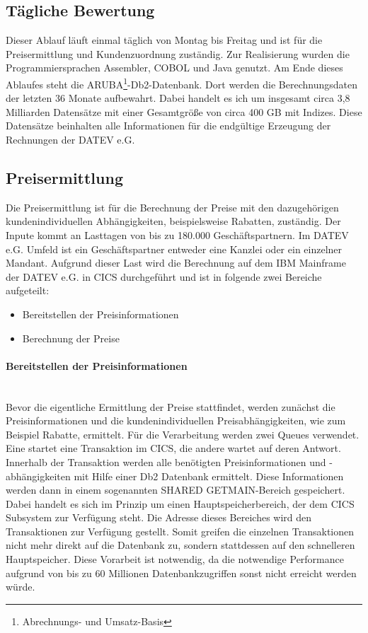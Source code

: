 \subsection{Tägliche Bewertung}\label{sssec:täglbew}
Dieser Ablauf läuft einmal täglich von Montag bis Freitag und ist für die Preisermittlung und Kundenzuordnung zuständig.
Zur Realisierung wurden die Programmiersprachen Assembler, COBOL und Java genutzt.
Am Ende dieses Ablaufes steht die ARUBA\footnote{Abrechnungs- und Umsatz-Basis}-Db2-Datenbank.
Dort werden die Berechnungsdaten der letzten 36 Monate aufbewahrt.
Dabei handelt es ich um insgesamt circa 3,8 Milliarden Datensätze mit einer Gesamtgröße von circa 400 GB mit Indizes.
Diese Datensätze beinhalten alle Informationen für die endgültige Erzeugung der Rechnungen der DATEV e.G.

\subsection{Preisermittlung}\label{ssec:preis}
Die Preisermittlung ist für die Berechnung der Preise mit den dazugehörigen kundenindividuellen Abhängigkeiten, beispielsweise Rabatten, zuständig.
Der Inpute kommt an Lasttagen von bis zu 180.000 Geschäftspartnern.
Im DATEV e.G. Umfeld ist ein Geschäftspartner entweder eine Kanzlei oder ein einzelner Mandant.
Aufgrund dieser Last wird die Berechnung auf dem IBM Mainframe der DATEV e.G. in CICS durchgeführt und ist in folgende zwei Bereiche aufgeteilt:
\begin{itemize}
\item Bereitstellen der Preisinformationen
\item Berechnung der Preise
\end{itemize}
\paragraph{Bereitstellen der Preisinformationen}~\\
Bevor die eigentliche Ermittlung der Preise stattfindet, werden zunächst die Preisinformationen und die kundenindividuellen Preisabhängigkeiten, wie zum Beispiel Rabatte, ermittelt.
Für die Verarbeitung werden zwei Queues verwendet.
Eine startet eine Transaktion im CICS, die andere wartet auf deren Antwort.
Innerhalb der Transaktion werden alle benötigten Preisinformationen und -abhängigkeiten mit Hilfe einer Db2 Datenbank ermittelt.
Diese Informationen werden dann in einem sogenannten \glqq SHARED GETMAIN\grqq-Bereich gespeichert.
Dabei handelt es sich im Prinzip um einen Hauptspeicherbereich, der dem CICS Subsystem zur Verfügung steht.
Die Adresse dieses Bereiches wird den Transaktionen zur Verfügung gestellt.
Somit greifen die einzelnen Transaktionen nicht mehr direkt auf die Datenbank zu, sondern stattdessen auf den schnelleren Hauptspeicher.
Diese Vorarbeit ist notwendig, da die notwendige Performance aufgrund von bis zu 60 Millionen Datenbankzugriffen sonst nicht erreicht werden würde.

